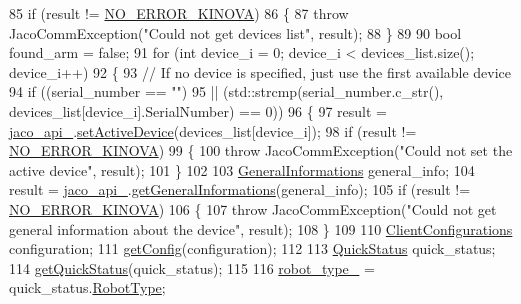 \begin{DoxyCode}
85     \textcolor{keywordflow}{if} (result != \hyperlink{Kinova_8API_8CommLayerUbuntu_8h_a510f2320a2a31d2d225adc0da7bef595}{NO\_ERROR\_KINOVA})
86     \{
87         \textcolor{keywordflow}{throw} JacoCommException(\textcolor{stringliteral}{"Could not get devices list"}, result);
88     \}
89 
90     \textcolor{keywordtype}{bool} found\_arm = \textcolor{keyword}{false};
91     \textcolor{keywordflow}{for} (\textcolor{keywordtype}{int} device\_i = 0; device\_i < devices\_list.size(); device\_i++)
92     \{
93         \textcolor{comment}{// If no device is specified, just use the first available device}
94         \textcolor{keywordflow}{if} ((serial\_number == \textcolor{stringliteral}{""})
95             || (std::strcmp(serial\_number.c\_str(), devices\_list[device\_i].SerialNumber) == 0))
96         \{
97             result = \hyperlink{classjaco_1_1JacoComm_a8d1510c941f28a4e8f921691d4fd2248}{jaco\_api\_}.\hyperlink{classjaco_1_1JacoAPI_a4e0c8fc007f20e985545b59abf571ea0}{setActiveDevice}(devices\_list[device\_i]);
98             \textcolor{keywordflow}{if} (result != \hyperlink{Kinova_8API_8CommLayerUbuntu_8h_a510f2320a2a31d2d225adc0da7bef595}{NO\_ERROR\_KINOVA})
99             \{
100                 \textcolor{keywordflow}{throw} JacoCommException(\textcolor{stringliteral}{"Could not set the active device"}, result);
101             \}
102 
103             \hyperlink{KinovaTypes_8h_d2/d0f/structGeneralInformations}{GeneralInformations} general\_info;
104             result = \hyperlink{classjaco_1_1JacoComm_a8d1510c941f28a4e8f921691d4fd2248}{jaco\_api\_}.\hyperlink{classjaco_1_1JacoAPI_ae1e29dcccd26e66e34271beff3a52f8c}{getGeneralInformations}(general\_info);
105             \textcolor{keywordflow}{if} (result != \hyperlink{Kinova_8API_8CommLayerUbuntu_8h_a510f2320a2a31d2d225adc0da7bef595}{NO\_ERROR\_KINOVA})
106             \{
107                 \textcolor{keywordflow}{throw} JacoCommException(\textcolor{stringliteral}{"Could not get general information about the device"}, result);
108             \}
109 
110             \hyperlink{KinovaTypes_8h_d1/d2e/structClientConfigurations}{ClientConfigurations} configuration;
111             \hyperlink{classjaco_1_1JacoComm_a47a3557e9b5576bc83df936caa043270}{getConfig}(configuration);
112 
113             \hyperlink{KinovaTypes_8h_df/d9d/structQuickStatus}{QuickStatus} quick\_status;
114             \hyperlink{classjaco_1_1JacoComm_a29384597e710d4cbb4e1f2ae6b7d7e50}{getQuickStatus}(quick\_status);
115 
116             \hyperlink{classjaco_1_1JacoComm_afb603f289e6ed8855cbeb0d0b1400829}{robot\_type\_} = quick\_status.\hyperlink{KinovaTypes_8h_a74b2c900b935a07df18fbea12c3f4d68}{RobotType};

\end{DoxyCode}
